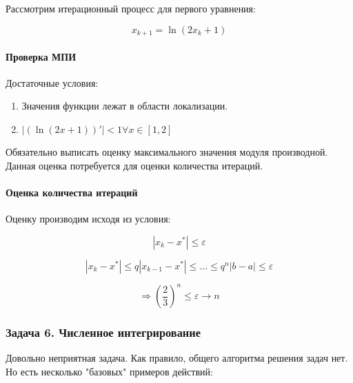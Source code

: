 \documentclass[10pt,a4paper]{article}
\begin{document}
	Рассмотрим итерационный процесс для первого уравнения:
	
	\begin{equation}
		x_{k + 1} = \ln\left(2x_{k} + 1\right)
	\end{equation}
	
	\paragraph{Проверка МПИ}
	
	Достаточные условия:
	
	\begin{enumerate}
		\item Значения функции лежат в области локализации.
		\item $\left|\left(\ln\left(2x + 1\right)\right)'\right| < 1 \forall 
		x \in \left[1, 2\right]$
	\end{enumerate}
	
	Обязательно выписать оценку максимального значения модуля производной.
	Данная оценка потребуется для оценки количества итераций.
	
	\paragraph{Оценка количества итераций}
	
	Оценку производим исходя из условия:
	
	\begin{equation}
		\left|x_{k} - x^{*}\right| \leqslant \varepsilon
	\end{equation}
	
	\begin{equation}
		\left|x_{k} - x^{*}\right| \leqslant q\left|x_{k - 1} - x^{*}\right| 
		\leqslant \ldots \leqslant q^{n}\left|b - a\right|\leqslant \varepsilon
	\end{equation}
	
	\begin{equation}
		\Rightarrow \left(\frac{2}{3}\right)^{n} \leqslant \varepsilon 
		\rightarrow n
	\end{equation}
	
	\subsubsection{Задача 6. Численное интегрирование} Довольно неприятная 
	задача. Как правило, общего алгоритма решения задач нет. Но есть несколько 
	"базовых" примеров действий:
	
\end{document}
